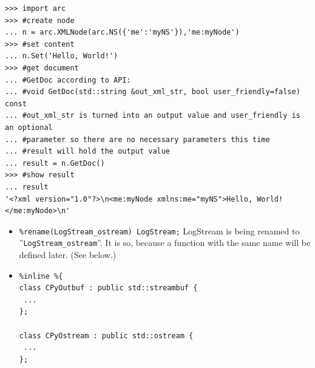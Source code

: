 \documentclass{article}
\begin{document}
\begin{flushleft}
\begin{itemize}
{\begin{example}
\begin{verbatim}
>>> import arc
>>> #create node
... n = arc.XMLNode(arc.NS({'me':'myNS'}),'me:myNode')
>>> #set content
... n.Set('Hello, World!')
>>> #get document
... #GetDoc according to API:
... #void GetDoc(std::string &out_xml_str, bool user_friendly=false) const
... #out_xml_str is turned into an output value and user_friendly is an optional 
... #parameter so there are no necessary parameters this time
... #result will hold the output value
... result = n.GetDoc()
>>> #show result
... result
'<?xml version="1.0"?>\n<me:myNode xmlns:me="myNS">Hello, World!</me:myNode>\n'
\end{verbatim}
    \end{example}
  }
\end{itemize}
\begin{itemize}
  \item{\verb$%rename(LogStream_ostream) LogStream;$ \linebreak
  LogStream is being renamed to ''\verb$LogStream_ostream$''.
  It is so, because a function with the same name will be defined later.
  (See below.)
  }
\end{itemize}
\begin{itemize}
  \item{
\begin{verbatim}
%inline %{ 
class CPyOutbuf : public std::streambuf {
 ...
};

class CPyOstream : public std::ostream {
 ...
}; 


\end{verbatim}}
\end{itemize}
\end{flushleft}
\end{document}
